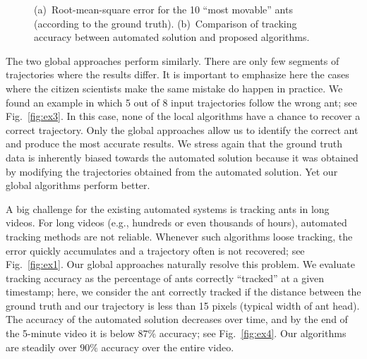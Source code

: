 \documentclass{llncs}
\begin{document}
\begin{figure}[t]
    \center
    \caption{
    (a)~Root-mean-square error for the 10 ``most movable'' ants
(according to the ground truth).
    (b)~Comparison of tracking accuracy between automated solution and
proposed algorithms.}
\end{figure}




The two global approaches perform similarly. There are only few
segments of trajectories where the results differ.
It is important to emphasize here the cases where the citizen
scientists make the same mistake do happen in practice.
We found an example in which 5 out of 8 input trajectories follow the
wrong ant; see Fig.~\ref{fig:ex3}. In this case,
none of the local algorithms have a chance to recover a correct
trajectory. Only the global approaches allow us to identify the
correct ant and produce the most accurate results.
We stress again that the ground truth data is inherently biased
towards the automated solution because it was obtained by modifying
the trajectories obtained from the automated solution. Yet our
global algorithms perform better.



A big challenge for the existing automated systems is tracking
ants in long videos. For long videos (e.g., hundreds or even thousands
of hours), automated tracking methods are not reliable. Whenever such
algorithms loose tracking, the error quickly accumulates and a
trajectory often is not recovered; see Fig.~\ref{fig:ex1}. Our global
approaches naturally resolve this problem. We evaluate
tracking accuracy as the percentage of ants correctly ``tracked'' at a
given timestamp; here, we consider the ant correctly tracked if the
distance between the ground truth and our trajectory is less than 15
pixels (typical width of ant head).
The accuracy of the automated solution decreases over time, and by the
end of the 5-minute video it is below $87\%$ accuracy; see
Fig.~\ref{fig:ex4}. Our algorithms are steadily over $90\%$ accuracy
over the entire video.
\end{document}
